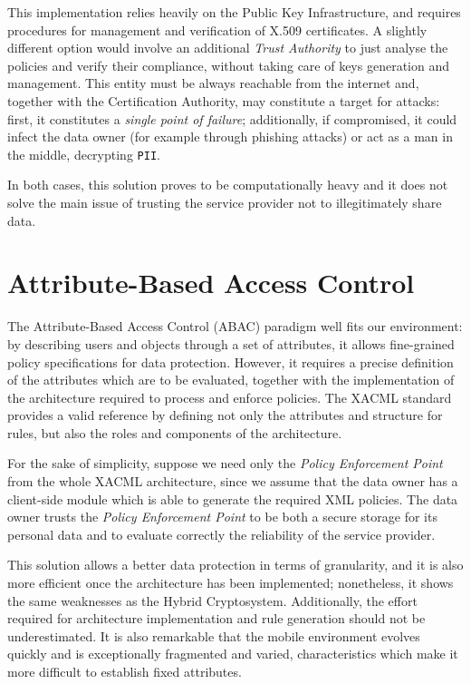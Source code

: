 This implementation relies heavily on the Public Key Infrastructure, and requires procedures for management and verification of X.509 certificates. A slightly different option would involve an additional \textit{Trust Authority} to just analyse the policies and verify their compliance, without taking care of keys generation and management. This entity must be always reachable from the internet and, together with the Certification Authority, may constitute a target for attacks: first, it constitutes a \textit{single point of failure}; additionally, if compromised, it could infect the data owner (for example through phishing attacks) or act as a man in the middle, decrypting \texttt{PII}.

In both cases, this solution proves to be computationally heavy and it does not solve the main issue of trusting the service provider not to illegitimately share data.

\section{Attribute-Based Access Control}
The Attribute-Based Access Control (ABAC) paradigm well fits our environment: by describing users and objects through a set of attributes, it allows fine-grained policy specifications for data protection. However, it requires a precise definition of the attributes which are to be evaluated, together with the implementation of the architecture required to process and enforce policies. The XACML standard \cite{standard2005extensible} provides a valid reference by defining not only the attributes and structure for rules, but also the roles and components of the architecture.

For the sake of simplicity, suppose we need only the \textit{Policy Enforcement Point} from the whole XACML architecture, since we assume that the data owner has a client-side module which is able to generate the required XML policies. The data owner trusts the \textit{Policy Enforcement Point} to be both a secure storage for its personal data and to evaluate correctly the reliability of the service provider.

This solution allows a better data protection in terms of granularity, and it is also more efficient once the architecture has been implemented; nonetheless, it shows the same weaknesses as the Hybrid Cryptosystem. Additionally, the effort required for architecture implementation and rule generation should not be underestimated. It is also remarkable that the mobile environment evolves quickly and is exceptionally fragmented and varied, characteristics which make it more difficult to establish fixed attributes.

